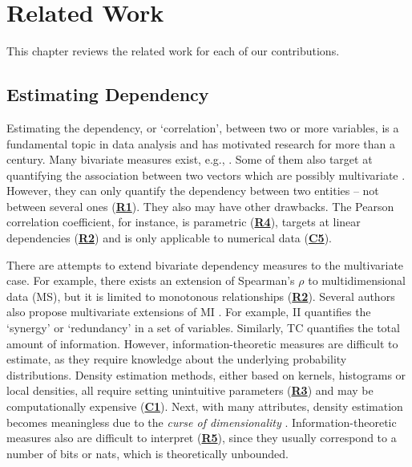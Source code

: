 \chapter{Related Work}
\glsresetall
\label{chapter:relatedwork}

This chapter reviews the related work for each of our contributions.

\section{Estimating Dependency}

Estimating the dependency, or `correlation', between two or more variables, is a fundamental topic in data analysis and has motivated research for more than a century. Many bivariate measures exist, e.g., \cite{10.2307/1412159, 10.2307/1412159, 10.2307/2332226, Reshef1518}. Some of them also target at quantifying the association between two vectors which are possibly multivariate \cite{DBLP:conf/nips/GrettonFTSSS07, 10.2307/27801540, DBLP:conf/nips/Lopez-PazHS13, DBLP:conf/icml/BelghaziBROBHC18}. 
However, they can only quantify the dependency between two entities -- not between several ones (\hyperlink{R1}{\textbf{R1}}). %
They also may have other drawbacks. 
The Pearson correlation coefficient, for instance, is parametric  (\hyperlink{R4}{\textbf{R4}}), targets at linear dependencies (\hyperlink{R2}{\textbf{R2}}) and is only applicable to numerical data (\hyperlink{C5}{\textbf{C5}}).

There are attempts to extend bivariate dependency measures to the multivariate case. For example, there exists an extension of Spearman's $\rho$ to multidimensional data (\gls{MS}), but it is limited to monotonous relationships (\hyperlink{R2}{\textbf{R2}}). 
Several authors also propose multivariate extensions of \gls{MI} \cite{DBLP:journals/jcns/TimmeAFB14}. For example, \gls{II} \cite{DBLP:journals/tit/McGill54} quantifies the `synergy' or `redundancy' in a set of variables. Similarly, \gls{TC} \cite{DBLP:journals/ibmrd/Watanabe60} quantifies the total amount of information. 
However, information-theoretic measures are difficult to estimate, as they require knowledge about the underlying probability distributions. Density estimation methods, either based on kernels, histograms or local densities, 
all require setting unintuitive  parameters (\hyperlink{R3}{\textbf{R3}}) and may be computationally expensive (\hyperlink{C1}{\textbf{C1}}). Next, with many attributes, density estimation becomes meaningless due to the \textit{curse of dimensionality} \cite{bellman1957}. 
Information-theoretic measures also are difficult to interpret (\hyperlink{R5}{\textbf{R5}}), since they usually correspond to a number of bits or nats, which is theoretically unbounded. 

